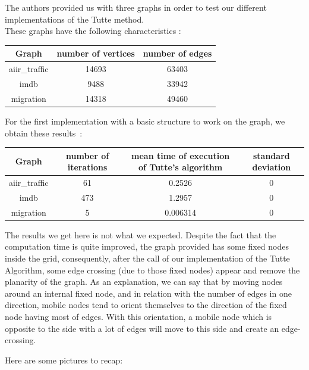 
The authors provided us with three graphs in order to test our
different implementations of the Tutte method.\\

These graphs have the following characteristics :

\begin{center}
\begin{tabular}{|c|c|c|}
\hline
Graph & number of vertices & number of edges \\
\hline
aiir\_traffic & 14693 & 63403\\
imdb & 9488 & 33942\\
migration & 14318 & 49460\\
\hline
\end{tabular}
\end{center}


For the first implementation with a basic structure to
work on the graph, we obtain these results~:

\begin{center}
\begin{tabular}{|c|c|c|c|}
\hline
Graph & number of iterations & mean time of execution of Tutte's algorithm & standard deviation\\
\hline
aiir\_traffic & 61 & 0.2526 & 0\\
imdb & 473 & 1.2957 & 0\\
migration & 5 & 0.006314 & 0\\
\hline

\end{tabular}
\end{center}

The results we get here is not what we expected. Despite the fact that the computation time is quite improved, the graph provided has some fixed nodes inside the grid, consequently, after the call of our implementation of the Tutte Algorithm, some edge crossing (due to those fixed nodes) appear and remove the planarity of the graph. As an explanation, we can say that by moving nodes around an internal fixed node, and in relation with the number of edges in one direction, mobile nodes tend to orient themselves to the direction of the fixed node having most of edges. With this orientation, a mobile node which is opposite to the side with a lot of edges will move to this side and create an edge-crossing.

Here are some pictures to recap:

